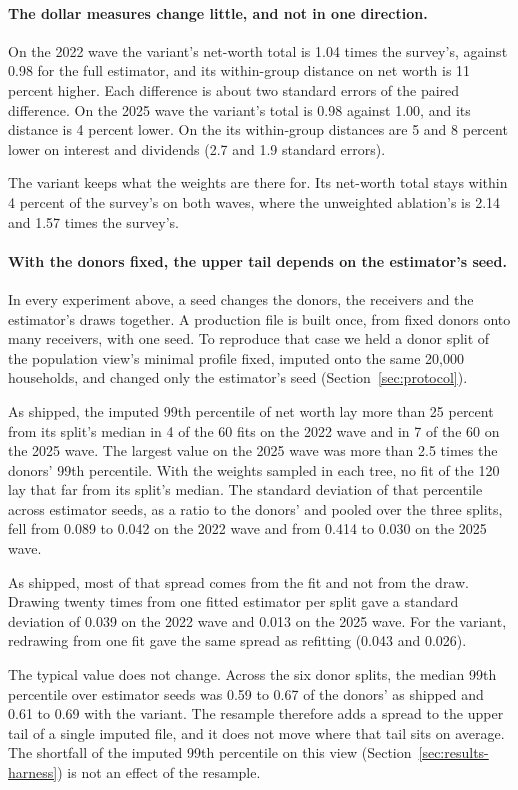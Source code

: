 \paragraph{The dollar measures change little, and not in one direction.} On
the 2022 wave the variant's net-worth total is 1.04 times the survey's,
against 0.98 for the full estimator, and its within-group distance on net
worth is 11 percent higher. Each difference is about two standard errors of
the paired difference. On the 2025 wave the variant's total is 0.98 against
1.00, and its distance is 4 percent lower. On the \cps{} its within-group
distances are 5 and 8 percent lower on interest and dividends (2.7 and 1.9
standard errors).

The variant keeps what the weights are there for. Its net-worth total stays
within 4 percent of the survey's on both waves, where the unweighted
ablation's is 2.14 and 1.57 times the survey's.

\paragraph{With the donors fixed, the upper tail depends on the estimator's
seed.} In every experiment above, a seed changes the donors, the receivers
and the estimator's draws together. A production file is built once, from
fixed donors onto many receivers, with one seed. To reproduce that case we
held a donor split of the population view's minimal profile fixed, imputed
onto the same 20,000 \cps{} households, and changed only the estimator's
seed (Section~\ref{sec:protocol}).

As shipped, the imputed 99th percentile of net worth lay more than 25
percent from its split's median in 4 of the 60 fits on the 2022 wave and in
7 of the 60 on the 2025 wave. The largest value on the 2025 wave was more
than 2.5 times the donors' 99th percentile. With the weights sampled in each
tree, no fit of the 120 lay that far from its split's median. The standard
deviation of that percentile across estimator seeds, as a ratio to the
donors' and pooled over the three splits, fell from 0.089 to 0.042 on the
2022 wave and from 0.414 to 0.030 on the 2025 wave.

As shipped, most of that spread comes from the fit and not from the draw.
Drawing twenty times from one fitted estimator per split gave a standard
deviation of 0.039 on the 2022 wave and 0.013 on the 2025 wave. For the
variant, redrawing from one fit gave the same spread as refitting (0.043
and 0.026).

The typical value does not change. Across the six donor splits, the median
99th percentile over estimator seeds was 0.59 to 0.67 of the donors' as
shipped and 0.61 to 0.69 with the variant. The resample therefore adds a
spread to the upper tail of a single imputed file, and it does not move
where that tail sits on average. The shortfall of the imputed 99th
percentile on this view (Section~\ref{sec:results-harness}) is not an effect
of the resample.
